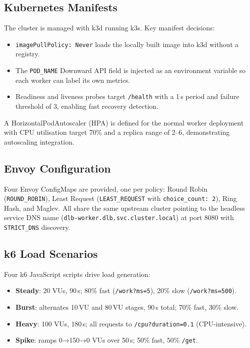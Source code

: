 \documentclass[conference]{IEEEtran}
\begin{document}
\subsection{Kubernetes Manifests}

The cluster is managed with k3d running k3s.
Key manifest decisions:
\begin{itemize}
  \item \texttt{imagePullPolicy: Never} loads the locally built image into k3d
        without a registry.
  \item The \texttt{POD\_NAME} Downward API field is injected as an environment
        variable so each worker can label its own metrics.
  \item Readiness and liveness probes target \texttt{/health} with a 1\,s period
        and failure threshold of 3, enabling fast recovery detection.
\end{itemize}

A HorizontalPodAutoscaler (HPA) is defined for the normal worker deployment
with CPU utilisation target 70\% and a replica range of 2--6, demonstrating
autoscaling integration.

\subsection{Envoy Configuration}

Four Envoy ConfigMaps are provided, one per policy:
Round Robin (\texttt{ROUND\_ROBIN}), Least Request (\texttt{LEAST\_REQUEST}
with \texttt{choice\_count: 2}), Ring Hash, and Maglev.
All share the same upstream cluster pointing to the headless service DNS name
(\texttt{dlb-worker.dlb.svc.cluster.local}) at port 8080 with
\texttt{STRICT\_DNS} discovery.

\subsection{k6 Load Scenarios}

Four k6 JavaScript scripts drive load generation:
\begin{itemize}
  \item \textbf{Steady}: 20 VUs, 90\,s; 80\% fast (\texttt{/work?ms=5}),
        20\% slow (\texttt{/work?ms=500}).
  \item \textbf{Burst}: alternates 10\,VU and 80\,VU stages, 90\,s total;
        70\% fast, 30\% slow.
  \item \textbf{Heavy}: 100 VUs, 180\,s; all requests to
        \texttt{/cpu?duration=0.1} (CPU-intensive).
  \item \textbf{Spike}: ramps 0→150→0 VUs over 50\,s; 50\% fast, 50\%
        \texttt{/get}.
\end{itemize}
\end{document}
